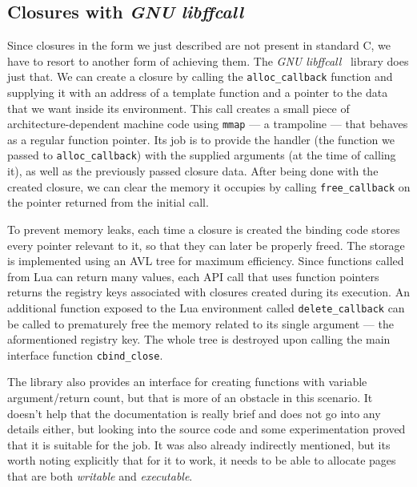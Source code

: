 \documentclass[polish, english]{iithesis}
\begin{document}
    \subsection{Closures with \textit{GNU libffcall}}\label{ffcall_closures}
      Since closures in the form we just described are not present in standard C, we have to resort to another form of achieving them.
      The \textit{GNU libffcall}~\cite{ffcall} library does just that.
      We can create a closure by calling the \texttt{alloc\_callback} function and supplying it with an address of a template function and a pointer to the data that we want inside its environment.
      This call creates a small piece of architecture-dependent machine code using \texttt{mmap} --- a trampoline --- that behaves as a regular function pointer.
      Its job is to provide the handler (the function we passed to \texttt{alloc\_callback}) with the supplied arguments (at the time of calling it), as well as the previously passed closure data.
      After being done with the created closure, we can clear the memory it occupies by calling \texttt{free\_callback} on the pointer returned from the initial call.

      To prevent memory leaks, each time a closure is created the binding code stores every pointer relevant to it, so that they can later be properly freed.
      The storage is implemented using an AVL tree for maximum efficiency.
      Since functions called from Lua can return many values, each API call that uses function pointers returns the registry keys associated with closures created during its execution.
      An additional function exposed to the Lua environment called \texttt{delete\_callback} can be called to prematurely free the memory related to its single argument --- the aformentioned registry key.
      The whole tree is destroyed upon calling the main interface function \texttt{cbind\_close}.

      The library also provides an interface for creating functions with variable argument/return count, but that is more of an obstacle in this scenario.
      It doesn't help that the documentation is really brief and does not go into any details either, but looking into the source code and some experimentation proved that it is suitable for the job.
      It was also already indirectly mentioned, but its worth noting explicitly that for it to work, it needs to be able to allocate pages that are both \textit{writable} and \textit{executable}.
\end{document}
